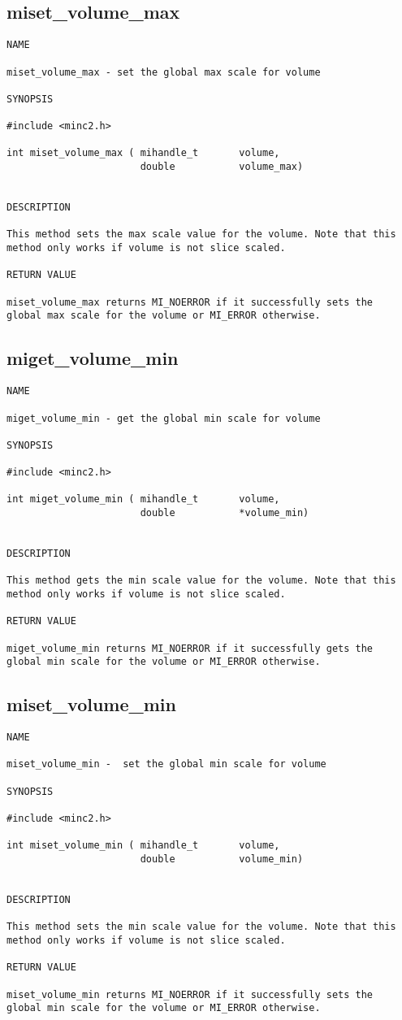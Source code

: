 \documentclass{article}
\begin{document}
\subsection{miset\_volume\_max}
\begin{verbatim}
NAME

miset_volume_max - set the global max scale for volume

SYNOPSIS

#include <minc2.h>

int miset_volume_max ( mihandle_t       volume,
                       double           volume_max)


DESCRIPTION

This method sets the max scale value for the volume. Note that this 
method only works if volume is not slice scaled.

RETURN VALUE

miset_volume_max returns MI_NOERROR if it successfully sets the
global max scale for the volume or MI_ERROR otherwise. 
\end{verbatim}

\subsection{miget\_volume\_min}
\begin{verbatim}
NAME

miget_volume_min - get the global min scale for volume

SYNOPSIS

#include <minc2.h>

int miget_volume_min ( mihandle_t       volume,
                       double           *volume_min)


DESCRIPTION

This method gets the min scale value for the volume. Note that this 
method only works if volume is not slice scaled.

RETURN VALUE

miget_volume_min returns MI_NOERROR if it successfully gets the
global min scale for the volume or MI_ERROR otherwise. 
\end{verbatim}

\subsection{miset\_volume\_min}
\begin{verbatim}
NAME

miset_volume_min -  set the global min scale for volume

SYNOPSIS

#include <minc2.h>

int miset_volume_min ( mihandle_t       volume,
                       double           volume_min)


DESCRIPTION

This method sets the min scale value for the volume. Note that this 
method only works if volume is not slice scaled.

RETURN VALUE

miset_volume_min returns MI_NOERROR if it successfully sets the
global min scale for the volume or MI_ERROR otherwise.
\end{verbatim}
\end{document}
